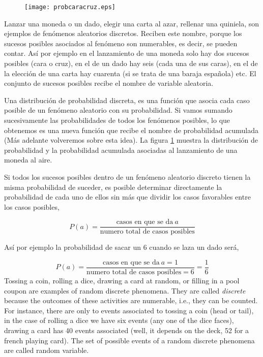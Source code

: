 \begin{figure}
\centering
\texttt{[image: probcaracruz.eps]}
\label{fig:moneda}
\end{figure}

\begin{paracol}{2}
Lanzar una moneda o un dado, elegir una carta al azar, rellenar una quiniela, son ejemplos de fenómenos aleatorios discretos. Reciben este nombre, porque los sucesos posibles asociados al fenómeno son numerables, es decir, se pueden contar.  Así por ejemplo en el lanzamiento de una moneda solo hay dos sucesos posibles (cara o cruz), en el de un dado hay seis (cada una de sus caras), en el de la elección de una carta hay cuarenta (si se trata de una baraja española) etc. El conjunto de sucesos posibles recibe el nombre de variable aleatoria. 

Una distribución de probabilidad discreta, es una función que asocia cada caso posible de un fenómeno aleatorio con su probabilidad. Si vamos sumando sucesivamente las probabilidades de todos los fenómenos posibles, lo que obtenemos es una nueva función que recibe el nombre de probabilidad acumulada (Más adelante volveremos sobre esta idea). La figura \ref{fig:moneda} muestra la distribución de probabilidad y la probabilidad acumulada asociadas al lanzamiento de una moneda al aire.

Si todos los sucesos posibles dentro de un fenómeno aleatorio discreto tienen la misma probabilidad de suceder,  es posible determinar directamente la probabilidad de cada uno de ellos sin más que  dividir los casos favorables  entre los casos posibles,

\begin{equation*}
P(a)=\frac{\text{casos en que se da} \ a}{\text{numero total de casos posibles}}
\end{equation*}

Así por ejemplo la probabilidad de sacar un $6$ cuando se laza un dado será,

\begin{equation*}
P(a)=\frac{\text{casos en que se da}\ a=1}{\text{numero total de casos posibles}=6}=\frac{1}{6}
\end{equation*}
\switchcolumn
Tossing a coin, rolling a dice, drawing a card at random, or filling in a pool coupon are examples of random discrete phenomena. They are called \emph{discrete} because the outcomes of these activities are numerable, i.e., they can be counted. For instance, there are only to events associated to tossing a coin (head or tail), in the case of rolling a dice we have six events (any one of the dice faces), drawing a card has 40 events associated (well, it depends on the deck, 52 for a french playing card). The set of possible events of a random discrete phenomena are called random variable. 


\end{paracol}
